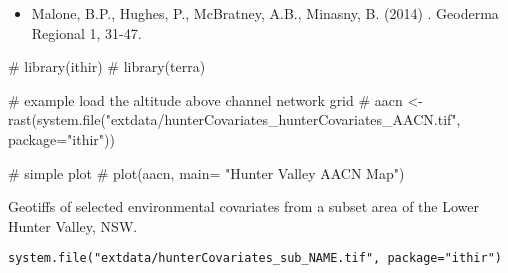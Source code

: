 \documentclass[a4paper]{book}
\begin{document}
%
\begin{References}
\begin{itemize}

\item{} Malone, B.P., Hughes, P.,  McBratney, A.B., Minasny, B. (2014) . Geoderma Regional 1, 31-47.

\end{itemize}

\end{References}
%
\begin{Examples}
\begin{ExampleCode}

# library(ithir)
# library(terra)

# example load the altitude above channel network grid
# aacn <- rast(system.file("extdata/hunterCovariates_hunterCovariates_AACN.tif", package="ithir"))

# simple plot
# plot(aacn, main= "Hunter Valley AACN Map")

\end{ExampleCode}
\end{Examples}
%
\begin{Description}
Geotiffs of selected environmental covariates from a subset area of the Lower Hunter Valley, NSW.
\end{Description}
%
\begin{Usage}
\begin{verbatim}
system.file("extdata/hunterCovariates_sub_NAME.tif", package="ithir")
\end{verbatim}
\end{Usage}
%
\end{document}
